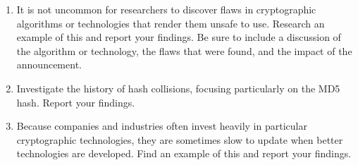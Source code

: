 \documentclass{book}
\theoremstyle{plain}
\theoremstyle{definition}
\begin{document}
\begin{enumerate}
\item It is not uncommon for researchers to discover flaws in cryptographic algorithms or technologies that render them unsafe to use. Research an example of this and report your findings. Be sure to include a discussion of the algorithm or technology, the flaws that were found, and the impact of the announcement.
\item Investigate the history of hash collisions, focusing particularly on the MD5 hash. Report your findings.
\item Because companies and industries often invest heavily in particular cryptographic technologies, they are sometimes slow to update when better technologies are developed. Find an example of this and report your findings.
\end{enumerate}


\nocite{*}

\end{document}
